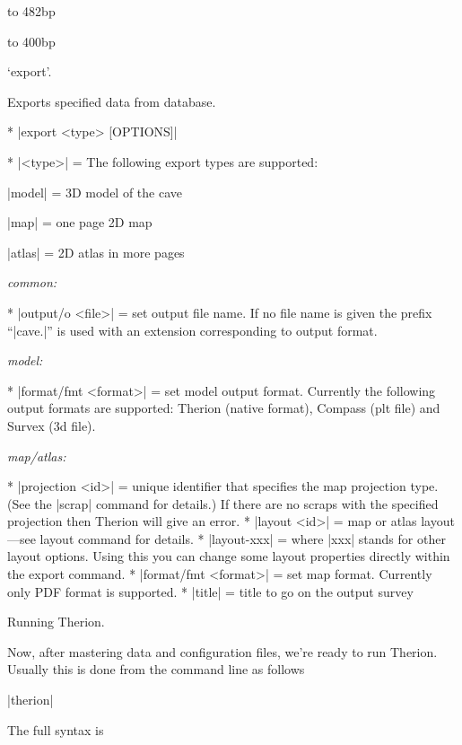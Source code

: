 \midinsert
  \ifx\pdfoutput\undefined\else
  \fi
  \vbox to 482bp{\centerline{\hbox to 400bp{%
    \ifx\pdfoutput\undefined
    \else
      \rlap{\pdfrefximage\pdflastximage}%
    \fi
    \hss}}\vss
  }
\endinsert


\subsubchapter `export'.

\description
  Exports specified data from database. 
\enddescription

\syntax
  \list
    * |export <type> [OPTIONS]| 
  \endlist
\endsyntax

\arguments
  * |<type>| = The following export types are supported:

    |model| = 3D model of the cave

    |map| = one page 2D map

    |atlas| = 2D atlas in more pages
\endarguments

\options
  {\it common:}

  * |output/o <file>| = set output file name. If no file name is
    given the prefix ``|cave.|'' is used with an extension corresponding to
    output format.

  {\it model:}

  * |format/fmt <format>| = set model output format. Currently the following
    output formats are supported: Therion (native format), Compass 
    (plt file) and Survex (3d file).

  {\it map/atlas:}
  
  * |projection <id>| = unique identifier that specifies the map projection type.
    (See the |scrap| command for details.) If there are no scraps with 
    the specified projection then Therion will give an error. 
  * |layout <id>| = map or atlas layout---see layout command for details.
  * |layout-xxx| = where |xxx| stands for other layout options. Using this
    you can change some layout properties directly within the export command.
  * |format/fmt <format>| = set map format. Currently only PDF format
    is supported.
  * |title| = title to go on the output survey    
\endoptions



\subchapter Running Therion.

Now, after mastering data and configuration files, we're ready to run Therion. 
Usually this is done from the command line as follows

|therion|

The full syntax is

